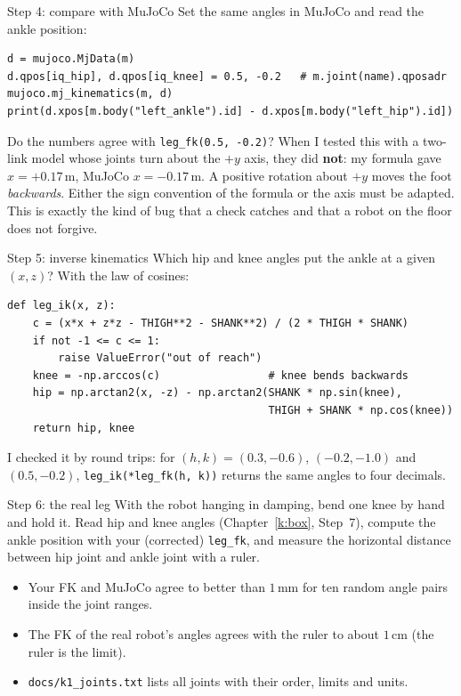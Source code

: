 \begin{stepbox}{Step 4: compare with MuJoCo}
Set the same angles in MuJoCo and read the ankle position:
\begin{verbatim}
d = mujoco.MjData(m)
d.qpos[iq_hip], d.qpos[iq_knee] = 0.5, -0.2   # m.joint(name).qposadr
mujoco.mj_kinematics(m, d)
print(d.xpos[m.body("left_ankle").id] - d.xpos[m.body("left_hip").id])
\end{verbatim}
Do the numbers agree with \verb!leg_fk(0.5, -0.2)!? When I tested this with a two-link model whose joints turn about the $+y$ axis, they did \textbf{not}: my formula gave $x=+0.17$\,m, MuJoCo $x=-0.17$\,m. A positive rotation about $+y$ moves the foot \emph{backwards}. Either the sign convention of the formula or the axis must be adapted. This is exactly the kind of bug that a check catches and that a robot on the floor does not forgive.
\end{stepbox}

\begin{stepbox}{Step 5: inverse kinematics}
Which hip and knee angles put the ankle at a given $(x,z)$? With the law of cosines:
\begin{verbatim}
def leg_ik(x, z):
    c = (x*x + z*z - THIGH**2 - SHANK**2) / (2 * THIGH * SHANK)
    if not -1 <= c <= 1:
        raise ValueError("out of reach")
    knee = -np.arccos(c)                 # knee bends backwards
    hip = np.arctan2(x, -z) - np.arctan2(SHANK * np.sin(knee),
                                         THIGH + SHANK * np.cos(knee))
    return hip, knee
\end{verbatim}
I checked it by round trips: for $(h,k)=(0.3,-0.6)$, $(-0.2,-1.0)$ and $(0.5,-0.2)$, \verb!leg_ik(*leg_fk(h, k))! returns the same angles to four decimals.
\end{stepbox}

\begin{stepbox}{Step 6: the real leg}
With the robot hanging in damping, bend one knee by hand and hold it. Read hip and knee angles (Chapter~\ref{k:box}, Step~7), compute the ankle position with your (corrected) \verb!leg_fk!, and measure the horizontal distance between hip joint and ankle joint with a ruler.
\end{stepbox}

\begin{checkbox}
\begin{itemize}[nosep]
  \item Your FK and MuJoCo agree to better than $1$\,mm for ten random angle pairs inside the joint ranges.
  \item The FK of the real robot's angles agrees with the ruler to about $1$\,cm (the ruler is the limit).
  \item \texttt{docs/k1\_joints.txt} lists all joints with their order, limits and units.
\end{itemize}
\end{checkbox}

